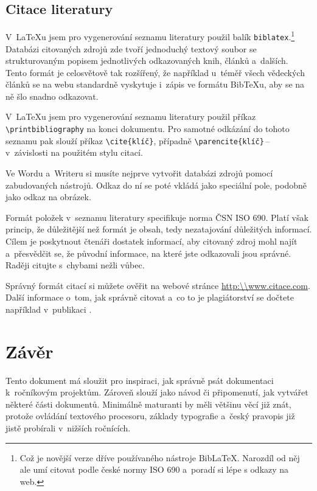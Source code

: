 \section{Citace literatury}
V~{\LaTeX}u jsem pro vygenerování seznamu literatury použil balík \texttt{biblatex}.\footnote{Což je novější verze dříve používaného nástroje Bib\LaTeX{}. Narozdíl od něj ale umí citovat podle české normy ISO 690 a~poradí si lépe s odkazy na web.} Databázi citovaných zdrojů zde tvoří jednoduchý textový soubor se strukturovaným popisem jednotlivých odkazovaných knih, článků a~dalších. Tento formát je celosvětově tak rozšířený, že například u~téměř všech vědeckých článků se na webu standardně vyskytuje i~zápis ve formátu Bib{\TeX}u, aby se na ně šlo snadno odkazovat.



V~{\LaTeX}u jsem pro vygenerování seznamu literatury použil příkaz  \verb+\printbibliography+ na konci dokumentu. Pro samotné odkázání do tohoto seznamu pak slouží příkaz \verb+\cite{klíč}+, případně \verb|\parencite{klíč}|\,--\,v~závislosti na použitém stylu citací.

Ve Wordu a~Writeru si musíte nejprve vytvořit databázi zdrojů pomocí zabudovaných nástrojů. Odkaz do ní se poté vkládá jako speciální pole, podobně jako odkaz na obrázek.

Formát položek v~seznamu literatury specifikuje norma ČSN ISO 690. Platí však princip, že důležitější než formát je obsah, tedy nezatajování důležitých informací. Cílem je poskytnout čtenáři dostatek informací, aby citovaný zdroj mohl najít a~přesvědčit se, že původní informace, na které jste odkazovali jsou správné. Raději citujte s~chybami nežli vůbec.

Správný formát citací si můžete ověřit na webové stránce \url{http:\\www.citace.com}. Další informace o~tom, jak správně citovat a~co to je plagiátorství se dočtete například v~publikaci \parencite{Citace15}.

\chapter{Závěr}
Tento dokument má sloužit pro inspiraci, jak správně psát dokumentaci k~ročníkovým projektům. Zároveň slouží jako návod či připomenutí, jak vytvářet některé části dokumentů. Minimálně maturanti by měli většinu věcí již znát, protože ovládání textového procesoru, základy typografie a~český pravopis již jistě probírali v~nižších ročnících.

